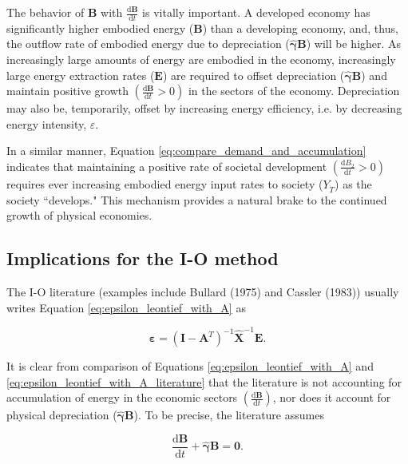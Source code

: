 \documentclass[authoryear,preprint,review,12pt]{elsarticle}
\let\oldhat\hat
\renewcommand{\vec}[1]{\mathbf{#1}}
\renewcommand{\hat}[1]{\oldhat{\mathbf{#1}}}
\begin{document}
The behavior of $\vec{B}$ with $\frac{\mathrm{d}\vec{B}}{\mathrm{d}t}$ is vitally important. A developed economy has significantly higher embodied energy ($\vec{B}$) than a developing economy, and, thus, the outflow rate of embodied energy due to depreciation ($\hat{\vec{\gamma}}\vec{B}$) will be higher. As increasingly large amounts of energy are embodied in the economy, increasingly large energy extraction rates ($\vec{E}$) are required to offset depreciation ($\hat{\vec{\gamma}}\vec{B}$) and maintain positive growth $\left(\frac{\mathrm{d}\vec{B}}{\mathrm{d}t} > 0\right)$ in the sectors of the economy. Depreciation may also be, temporarily, offset by increasing energy efficiency, i.e. by decreasing energy intensity, $\varepsilon$.

In a similar manner, Equation \ref{eq:compare_demand_and_accumulation} indicates that maintaining a positive rate of societal development $\left(\frac{\mathrm{d}B_{2}}{\mathrm{d}t} > 0\right)$ requires ever increasing embodied energy input rates to society ($Y_{\dot{T}}$) as the society ``develops." This mechanism provides a natural brake to the continued growth of physical economies.


\subsection{Implications for the I-O method}

The I-O literature (examples include Bullard (1975) and Cassler (1983)) usually writes Equation \ref{eq:epsilon_leontief_with_A} as

\begin{equation} \label{eq:epsilon_leontief_with_A_literature}
	\vec{\varepsilon} = (\vec{I} - \vec{A}^{T})^{-1}\hat{\vec{X}}^{-1}\vec{E}.
\end{equation}

\noindent It is clear from comparison of Equations \ref{eq:epsilon_leontief_with_A} and \ref{eq:epsilon_leontief_with_A_literature} that the literature is not accounting for accumulation of energy in the economic sectors $\left(\frac{\mathrm{d}\vec{B}}{\mathrm{d}t}\right)$, nor does it account for physical depreciation ($\hat{\vec{\gamma}}\vec{B}$). To be precise, the literature assumes

\begin{equation} \label{eq:dB_dt_plus_gamma_zero_assumption}
	\frac{\mathrm{d}\vec{B}}{\mathrm{d}t} + \hat{\vec{\gamma}}\vec{B} = \vec{0}.
\end{equation}
\end{document}
